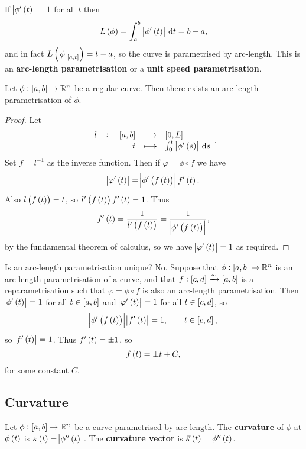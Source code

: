 If $ \abs{\phi'\br{t}} = 1 $ for all $ t $ then
$$ L\br{\phi} = \intd{a}{b}{\abs{\phi'\br{t}}}{t} = b - a, $$
and in fact $ L\br{\eval{\phi}_{\sbr{a, t}}} = t - a $, so the curve is parametrised by arc-length. This is an \textbf{arc-length parametrisation} or a \textbf{unit speed parametrisation}.

\begin{proposition}
Let $ \phi : \sbr{a, b} \to \R^n $ be a regular curve. Then there exists an arc-length parametrisation of $ \phi $.
\end{proposition}

\begin{proof}
Let
$$ \function[l]{\sbr{a, b}}{\sbr{0, L}}{t}{\intd{0}{t}{\abs{\phi'\br{s}}}{s}}. $$
Set $ f = l^{-1} $ as the inverse function. Then if $ \varphi = \phi \circ f $ we have
$$ \abs{\varphi'\br{t}} = \abs{\phi'\br{f\br{t}}}f'\br{t}. $$
Also $ l\br{f\br{t}} = t $, so $ l'\br{f\br{t}}f'\br{t} = 1 $. Thus
$$ f'\br{t} = \dfrac{1}{l'\br{f\br{t}}} = \dfrac{1}{\abs{\phi'\br{f\br{t}}}}, $$
by the fundamental theorem of calculus, so we have $ \abs{\varphi'\br{t}} = 1 $ as required.
\end{proof}


Is an arc-length parametrisation unique? No. Suppose that $ \phi : \sbr{a, b} \to \R^n $ is an arc-length parametrisation of a curve, and that $ f : \sbr{c, d} \xrightarrow{\sim} \sbr{a, b} $ is a reparametrisation such that $ \varphi = \phi \circ f $ is also an arc-length parametrisation. Then $ \abs{\phi'\br{t}} = 1 $ for all $ t \in \sbr{a, b} $ and $ \abs{\varphi'\br{t}} = 1 $ for all $ t \in \sbr{c, d} $, so
$$ \abs{\phi'\br{f\br{t}}}\abs{f'\br{t}} = 1, \qquad t \in \sbr{c, d}, $$
so $ \abs{f'\br{t}} = 1 $. Thus $ f'\br{t} = \pm 1 $, so
$$ f\br{t} = \pm t + C, $$
for some constant $ C $.

\pagebreak

\subsection{Curvature}

\begin{definition}
Let $ \phi : \sbr{a, b} \to \R^n $ be a curve parametrised by arc-length. The \textbf{curvature} of $ \phi $ at $ \phi\br{t} $ is $ \kappa\br{t} = \abs{\phi''\br{t}} $. The \textbf{curvature vector} is $ \vec{\kappa}\br{t} = \phi''\br{t} $.
\end{definition}


